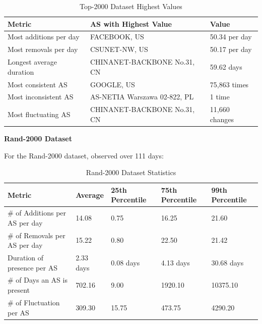 \documentclass[12pt]{cwru_thesis}
\begin{document}
\begin{table}[h!]
    \centering
    \begin{tabular}{|l|l|l|}
        \hline
        \textbf{Metric} & \textbf{AS with Highest Value} & \textbf{Value} \\
        \hline
        Most additions per day & FACEBOOK, US & 50.34 per day \\
        \hline
        Most removals per day & CSUNET-NW, US & 50.17 per day \\
        \hline
        Longest average duration & CHINANET-BACKBONE No.31, CN & 59.62 days \\
        \hline
        Most consistent AS & GOOGLE, US & 75,863 times \\
        \hline
        Most inconsistent AS & AS-NETIA Warszawa 02-822, PL & 1 time \\
        \hline
        Most fluctuating AS & CHINANET-BACKBONE No.31, CN & 11,660 changes \\
        \hline
    \end{tabular}
    \caption{Top-2000 Dataset Highest Values}
    \label{tab:top-2000-highest}
\end{table}

\textbf{Rand-2000 Dataset}

For the Rand-2000 dataset, observed over 111 days:

\begin{table}[h!]
    \centering
    \begin{tabular}{|l|l|l|l|l|}
        \hline
        \textbf{Metric} & \textbf{Average} & \textbf{25th Percentile} & \textbf{75th Percentile} & \textbf{99th Percentile} \\
        \hline
        \# of Additions per AS per day & 14.08 & 0.75 & 16.25 & 21.60 \\
        \hline
        \# of Removals per AS per day & 15.22 & 0.80 & 22.50 & 21.42 \\
        \hline
        Duration of presence per AS & 2.33 days & 0.08 days & 4.13 days & 30.68 days \\
        \hline
        \# of Days an AS is present & 702.16 & 9.00 & 1920.10 & 10375.10 \\
        \hline
        \# of Fluctuation per AS & 309.30 & 15.75 & 473.75 & 4290.20 \\
        \hline
    \end{tabular}
    \caption{Rand-2000 Dataset Statistics}
    \label{tab:rand-2000-stats}
\end{table}
\end{document}
